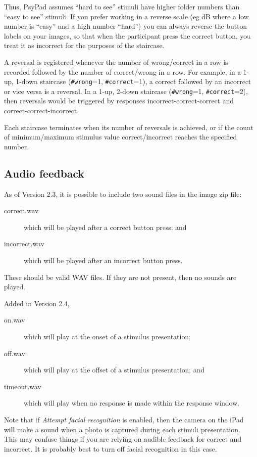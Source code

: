 \documentclass{article}
\begin{document}
Thus, PsyPad assumes ``hard to see'' stimuli have higher folder numbers than ``easy to see'' 
stimuli.
If you prefer working in a reverse scale (eg dB where a low number is ``easy'' and a high number ``hard'')
you can always reverse the button labels on your images, so that
when the participant press the correct button, you treat it as incorrect for the purposes of the 
staircase.

A reversal is registered whenever the number of wrong/correct in
a row is recorded followed by the number of correct/wrong in a row.
For example, in a 1-up, 1-down staircase 
({\tt \#wrong}=1, {\tt \#correct}=1),
a correct followed by an incorrect or vice versa is a reversal.
In a 1-up, 2-down staircase
({\tt \#wrong}=1, {\tt \#correct}=2), then reversals would be triggered by
responses incorrect-correct-correct and correct-correct-incorrect.

Each staircase terminates when its number of reversals is achieved, or 
if the count of minimum/maximum stimulus value correct/incorrect reaches 
the specified number.


\subsection{Audio feedback}

As of Version 2.3, it is possible to include two sound files in the 
image zip file:
    \begin{description}
         \item[correct.wav] which will be played after a correct button press; and
         \item[incorrect.wav] which will be played after an incorrect button press.
    \end{description}
These should be valid WAV files. If they are not present, then no sounds are played.

Added in Version 2.4, 
    \begin{description}
        \item[on.wav] which will play at the onset of a stimulus presentation;
        \item[off.wav] which will play at the offset of a stimulus presentation; and 
        \item[timeout.wav] which will play when no response is made within the response window.
    \end{description}
Note that if \emph{Attempt facial recognition} is enabled, then the camera on the iPad will 
make a sound when a photo is captured during each stimuli presentation. 
This may confuse things if you are relying on 
audible feedback for correct and incorrect. It is probably best to turn off 
facial recognition in this case.
\end{document}
